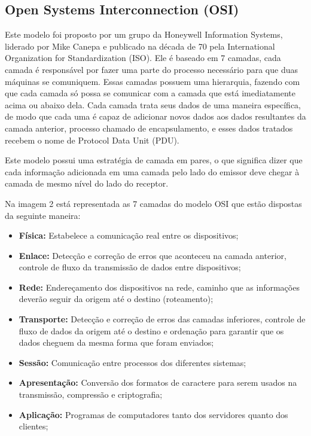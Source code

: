         \subsection{Open Systems Interconnection (OSI)}
            Este modelo foi proposto por um grupo da Honeywell Information Systems, liderado por Mike Canepa e publicado na década de 70 pela International Organization for Standardization (ISO). Ele é baseado em 7 camadas, cada camada é responsável por fazer uma parte do processo necessário para que duas máquinas se comuniquem. Essas camadas possuem uma hierarquia, fazendo com que cada camada só possa se comunicar com a camada que está imediatamente acima ou abaixo dela.  Cada camada trata seus dados de uma maneira específica, de modo que cada uma é capaz de adicionar novos dados aos dados resultantes da camada anterior, processo chamado de encapsulamento, e esses dados tratados recebem o nome de Protocol Data Unit (PDU).

		    Este modelo possui uma estratégia de camada em pares, o que significa dizer que cada informação adicionada em uma camada pelo lado do emissor deve chegar à camada de mesmo nível do lado do receptor.

		    Na imagem 2 está representada as 7 camadas do modelo OSI que estão dispostas da seguinte maneira:

            \begin{itemize}
                \item \textbf{Física:} Estabelece a comunicação real entre os dispositivos;
                \item \textbf{Enlace:} Detecção e correção de erros que aconteceu na camada anterior, controle de fluxo  da transmissão de dados entre dispositivos;
                \item \textbf{Rede:} Endereçamento dos dispositivos na rede, caminho que as informações deverão seguir da origem até o destino (roteamento);
                \item \textbf{Transporte:} Detecção e correção de erros das camadas inferiores, controle de fluxo de dados da origem até o destino e ordenação para garantir que os dados cheguem da mesma forma que foram enviados;
                \item \textbf{Sessão:} Comunicação entre processos dos diferentes sistemas;
                \item \textbf{Apresentação:} Conversão dos formatos de caractere para serem usados na transmissão, compressão e criptografia;
                \item \textbf{Aplicação:} Programas de computadores tanto dos servidores quanto dos clientes;
            \end{itemize}

